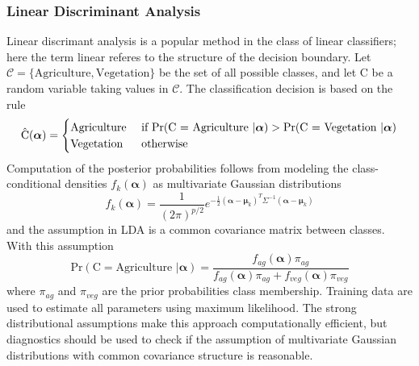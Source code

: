 \subsubsection{Linear Discriminant Analysis} %
\label{sub:LDA}
Linear discrimant analysis is a popular method in the class of linear classifiers; here the term linear referes to the structure of the decision boundary. Let $\mathcal{C} = \{ \text{Agriculture}, \text{Vegetation}\}$ be the set of all possible classes, and let C be a random variable taking values in $\mathcal{C}$. The classification decision is based on the rule
\begin{equation}
	\hat{\text{C}}(\boldsymbol{\alpha}) = 
	\begin{cases}
			\text{Agriculture} \hfill & \text{ if } \text{Pr}(\text{C = Agriculture }| \boldsymbol{\alpha})> \text{Pr}(\text{C = Vegetation }| \boldsymbol{\alpha})\\
			\text{Vegetation} \hfill & \text{ otherwise}
	\end{cases}
\end{equation}  
Computation of the posterior probabilities follows from modeling the class-conditional densities $f_k(\boldsymbol\alpha)$ as multivariate Gaussian distributions
\begin{equation}
	f_k(\boldsymbol\alpha) = \frac{1}{(2\pi)^{p/2}}e^{-\frac{1}{2}(\boldsymbol\alpha - \boldsymbol\mu_k)^T\Sigma^{-1}(\boldsymbol\alpha - \boldsymbol\mu_k)}
\end{equation}
and the assumption in LDA is a common covariance matrix between classes. With this assumption 
\begin{equation}
	\text{Pr}(\text{C} = \text{Agriculture } | \boldsymbol\alpha) = \frac{f_{ag}(\boldsymbol\alpha)\pi_{ag}}{f_{ag}(\boldsymbol\alpha)\pi_{ag}+f_{veg}(\boldsymbol\alpha)\pi_{veg}}
\end{equation}
where $\pi_{ag}$ and $\pi_{veg}$ are the prior probabilities class membership. Training data are used to estimate all parameters using maximum likelihood. The strong distributional assumptions make this approach computationally efficient, but diagnostics should be used to check if the assumption of multivariate Gaussian distributions with common covariance structure is reasonable. 

